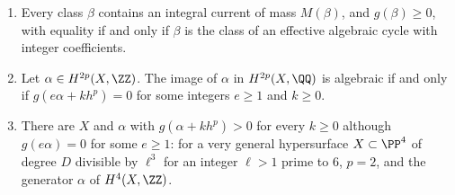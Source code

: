 \begin{proposition}\label{prop:mass}
\leavevmode
\begin{enumerate}[label=\textup{(\roman*)},leftmargin=2.4em,itemsep=2pt]
\item Every class $\beta$ contains an integral current of mass $M(\beta)$, and $g(\beta)\ge0$, with equality if and only if $\beta$ is the class of an effective algebraic cycle with integer coefficients.
\item Let $\alpha\in H^{2p}(X,\ZZ)$. The image of $\alpha$ in $H^{2p}(X,\QQ)$ is algebraic if and only if $g(e\alpha+kh^{p})=0$ for some integers $e\ge1$ and $k\ge0$.
\item There are $X$ and $\alpha$ with $g(\alpha+kh^{p})>0$ for every $k\ge0$ although $g(e\alpha)=0$ for some $e\ge1$: for a very general hypersurface $X\subset\PP^{4}$ of degree $D$ divisible by $\ell^{3}$ for an integer $\ell>1$ prime to $6$, $p=2$, and the generator $\alpha$ of $H^{4}(X,\ZZ)$.
\end{enumerate}
\end{proposition}

